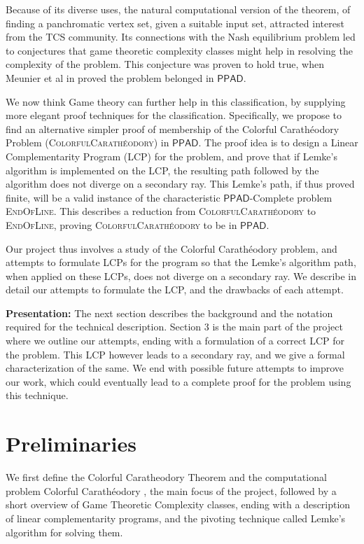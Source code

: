 \documentclass[a4paper,11pt]{article}
\def\cc#1{\mathsf{#1}}
\def\PPAD{\ensuremath{\cc{PPAD}}\xspace}
\def\problem#1{\textsc{#1}}
\def\EOL{\problem{EndOfLine}\xspace}
\def\CC{Colorful Carath\'eodory }
\def\CCP{\problem{ColorfulCarath\'eodory}\xspace}
\begin{document}
Because of its diverse uses, the natural computational version of the theorem, of finding a panchromatic vertex set, given a suitable input set, attracted interest from the TCS community. Its connections with the Nash equilibrium problem led to conjectures that game theoretic complexity classes might help in resolving the complexity of the problem. This conjecture was proven to hold true, when Meunier et al in \cite{CCP_PPAD} proved the problem belonged in \PPAD. 

We now think Game theory can further help in this classification, by supplying more elegant proof techniques for the classification. Specifically, we propose to find an alternative simpler proof of membership of the \CC Problem (\CCP) in \PPAD. The proof idea is to design a Linear Complementarity Program (LCP) for the problem, and prove that if Lemke's algorithm is implemented on the LCP, the resulting path followed by the algorithm does not diverge on a secondary ray. This Lemke's path, if thus proved finite, will be a valid instance of the characteristic \PPAD-Complete problem \EOL. This describes a reduction from \CCP to \EOL, proving \CCP to be in \PPAD.

Our project thus involves a study of the \CC problem, and attempts to formulate LCPs for the program so that the Lemke's algorithm path, when applied on these LCPs, does not diverge on a secondary ray. We describe in detail our attempts to formulate the LCP, and the drawbacks of each attempt. 

\textbf{Presentation:} The next section describes the background and the notation required for the technical description. Section $3$ is the main part of the project where we outline our attempts, ending with a formulation of a correct LCP for the problem. This LCP however leads to a secondary ray, and we give a formal characterization of the same. We end with possible future attempts to improve our work, which could eventually lead to a complete proof for the problem using this technique.   


\section{Preliminaries}
We first define the Colorful Caratheodory Theorem and the computational problem \CC, the main focus of the project, followed by a short overview of Game Theoretic Complexity classes, ending with a description of linear complementarity programs, and the pivoting technique called Lemke's algorithm for solving them.
\end{document}
